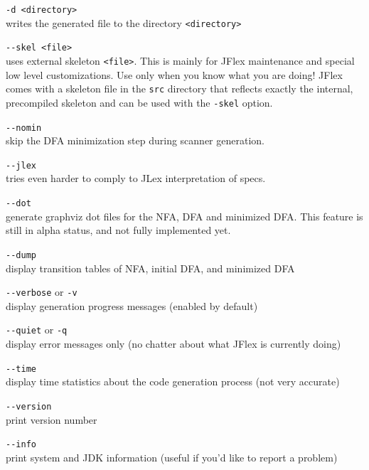 \documentclass[11pt]{scrartcl}
\begin{document}
\begin{description}
\item \verb+-d <directory>+\\
  writes the generated file to the directory \verb+<directory>+
  

\item \verb+--skel <file>+\\
  uses external skeleton \verb+<file>+. This is mainly for JFlex
  maintenance and special low level customizations. Use only when you
  know what you are doing! JFlex comes with a skeleton file in the
  \texttt{src} directory that reflects exactly the internal, precompiled
  skeleton and can be used with the \texttt{-skel} option.

\item \verb+--nomin+\\
  skip the DFA minimization step during scanner generation.

\item \verb+--jlex+\\
  tries even harder to comply to JLex interpretation of specs.

\item \verb+--dot+\\
  generate graphviz dot files for the NFA, DFA and minimized 
  DFA. This feature is still in alpha status, and not
  fully implemented yet. 

\item \verb+--dump+\\
  display transition tables of NFA, initial DFA, and minimized DFA 

\item \verb+--verbose+ or \texttt{-v}\\
  display generation progress messages (enabled by default)

\item \verb+--quiet+ or \texttt{-q}\\
  display error messages only (no chatter about what JFlex is
  currently doing)

\item \verb+--time+\\
  display time statistics about the code generation process
  (not very accurate)

\item \verb+--version+\\
  print version number 

\item \verb+--info+\\
  print system and JDK information (useful if you'd like
  to report a problem)


\end{description}
\end{document}
